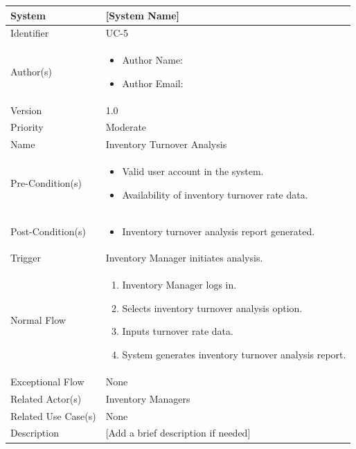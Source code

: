 \begin{center}
	\begin{tabularx}{\textwidth}{|l|X|}
		\hline
		System & [System Name] \\
		\hline
		Identifier & UC-5 \\
		\hline
		Author(s) & \begin{itemize}[left=0pt]
			\item Author Name:
			\item Author Email:
		\end{itemize} \\
		\hline
		Version & 1.0 \\
		\hline
		Priority & Moderate \\
		\hline
		Name & Inventory Turnover Analysis \\
		\hline
		Pre-Condition(s) &  \begin{itemize}[left=0pt]
			\item Valid user account in the system.
			\item Availability of inventory turnover rate data.
		\end{itemize} \\
		\hline
		Post-Condition(s) & \begin{itemize}[left=0pt]
			\item Inventory turnover analysis report generated.
		\end{itemize} \\
		\hline
		Trigger & Inventory Manager initiates analysis. \\
		\hline
		Normal Flow & \begin{enumerate}[left=0pt]
			\item Inventory Manager logs in.
			\item Selects inventory turnover analysis option.
			\item Inputs turnover rate data.
			\item System generates inventory turnover analysis report.
		\end{enumerate} \\
		\hline
		Exceptional Flow & None \\
		\hline
		Related Actor(s) & Inventory Managers \\
		\hline
		Related Use Case(s) & None \\
		\hline
		Description & [Add a brief description if needed] \\
		\hline
	\end{tabularx}
\end{center}

